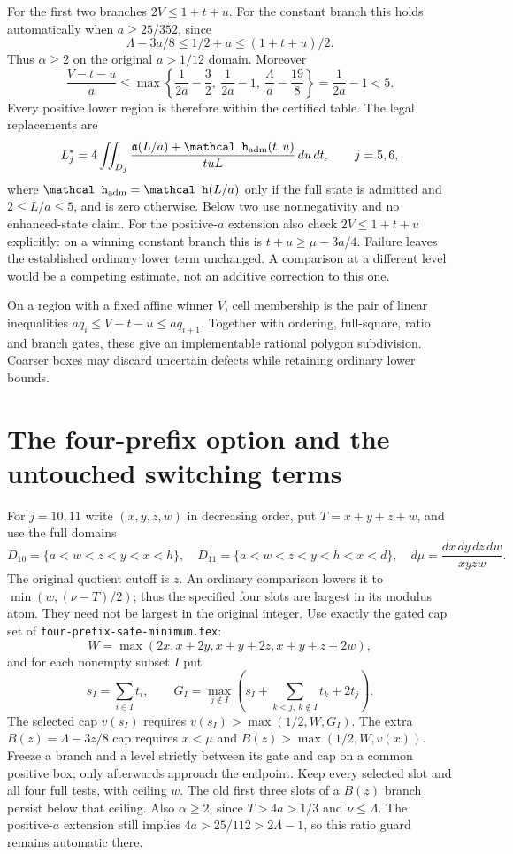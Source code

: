 \documentclass[11pt]{article}
\newcommand{\hh}{\mathcal h}
\newcommand{\alow}{\mathfrak a}
\newcommand{\Lam}{\Lambda}
\begin{document}
For the first two branches $2V\le1+t+u$. For the constant branch
this holds automatically when $a\ge25/352$, since
\[
 \Lam-3a/8\le1/2+a\le(1+t+u)/2.
\]
Thus $\alpha\ge2$ on the original $a>1/12$ domain. Moreover
\[
 \frac{V-t-u}{a}\le\max\left\{
 \frac1{2a}-\frac32,\ \frac1{2a}-1,\ \frac\Lam a-\frac{19}8
 \right\}=\frac1{2a}-1<5.
\]
Every positive lower region is therefore within the certified table.
The legal replacements are
\begin{equation}\label{eq:L56}
 L_j^*=4\iint_{D_j}\frac{\alow(L/a)+\hh_{\rm adm}(t,u)}{tuL}
 \,du\,dt,\qquad j=5,6,
\end{equation}
where $\hh_{\rm adm}=\hh(L/a)$ only if the full state is admitted
and $2\le L/a\le5$, and is zero otherwise. Below two use
nonnegativity and no enhanced-state claim. For the positive-$a$
extension also check $2V\le1+t+u$ explicitly: on a winning constant
branch this is $t+u\ge\mu-3a/4$. Failure leaves the established
ordinary lower term unchanged. A comparison at a different level
would be a competing estimate, not an additive correction to this one.

On a region with a fixed affine winner $V$, cell membership is the
pair of linear inequalities $aq_i\le V-t-u\le aq_{i+1}$.
Together with ordering, full-square, ratio and branch gates, these
give an implementable rational polygon subdivision. Coarser boxes
may discard uncertain defects while retaining ordinary lower bounds.

\section*{The four-prefix option and the untouched switching terms}
For $j=10,11$ write $(x,y,z,w)$ in decreasing order, put $T=x+y+z+w$,
and use the full domains
\[
 D_{10}=\{a<w<z<y<x<h\},\quad
 D_{11}=\{a<w<z<y<h<x<d\},\quad d\mu=\frac{dx\,dy\,dz\,dw}{xyzw}.
\]
The original quotient cutoff is $z$. An ordinary comparison lowers
it to $\min(w,(\nu-T)/2)$; thus the specified four slots are largest
in its modulus atom. They need not be largest in the original integer.
Use exactly the gated cap set of \texttt{four-prefix-safe-minimum.tex}:
\[
 W=\max(2x,x+2y,x+y+2z,x+y+z+2w),
\]
and for each nonempty subset $I$ put
\[
 s_I=\sum_{i\in I}t_i,\qquad
 G_I=\max_{j\notin I}\left(s_I+
              \sum_{k<j,\ k\notin I}t_k+2t_j\right).
\]
The selected cap $v(s_I)$ requires $v(s_I)>\max(1/2,W,G_I)$.
The extra $B(z)=\Lam-3z/8$ cap requires
$x<\mu$ and $B(z)>\max(1/2,W,v(x))$.
Freeze a branch and a level strictly between its gate and cap on a
common positive box; only afterwards approach the endpoint.
Keep every selected slot and all four full tests, with ceiling $w$.
The old first three slots of a $B(z)$ branch persist below that ceiling.
Also $\alpha\ge2$, since $T>4a>1/3$ and $\nu\le\Lam$.
The positive-$a$ extension still implies $4a>25/112>2\Lam-1$,
so this ratio guard remains automatic there.
\end{document}
